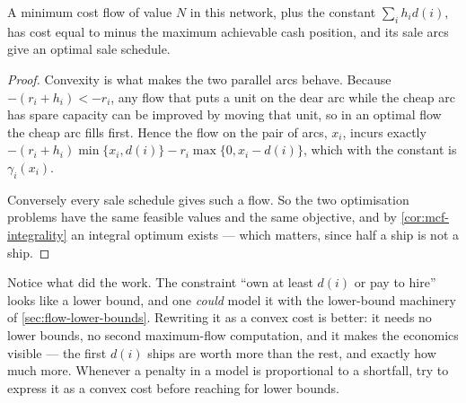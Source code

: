 \begin{lemma}\label{lem:mcf-ships-correct}
A minimum cost flow of value $N$ in this network, plus the constant
$\sum_i h_i d(i)$, has cost equal to minus the maximum achievable cash position,
and its sale arcs give an optimal sale schedule.
\end{lemma}

\begin{proof}
Convexity is what makes the two parallel arcs behave. Because
$-(r_i+h_i) < -r_i$, any flow that puts a unit on the dear arc while the cheap
arc has spare capacity can be improved by moving that unit, so in an optimal
flow the cheap arc fills first. Hence the flow on the pair of arcs, $x_i$,
incurs exactly $-(r_i+h_i)\min\{x_i,d(i)\} - r_i\max\{0,x_i-d(i)\}$, which with
the constant is $\gamma_i(x_i)$.

Conversely every sale schedule gives such a flow. So the two optimisation
problems have the same feasible values and the same objective, and by
\cref{cor:mcf-integrality} an integral optimum exists --- which matters, since
half a ship is not a ship.
\end{proof}

\begin{intuition}
Notice what did the work. The constraint ``own at least $d(i)$ or pay to hire''
looks like a lower bound, and one \emph{could} model it with the lower-bound
machinery of \cref{sec:flow-lower-bounds}. Rewriting it as a convex cost is
better: it needs no lower bounds, no second maximum-flow computation, and it
makes the economics visible --- the first $d(i)$ ships are worth more than the
rest, and exactly how much more. Whenever a penalty in a model is proportional
to a shortfall, try to express it as a convex cost before reaching for lower
bounds.
\end{intuition}


